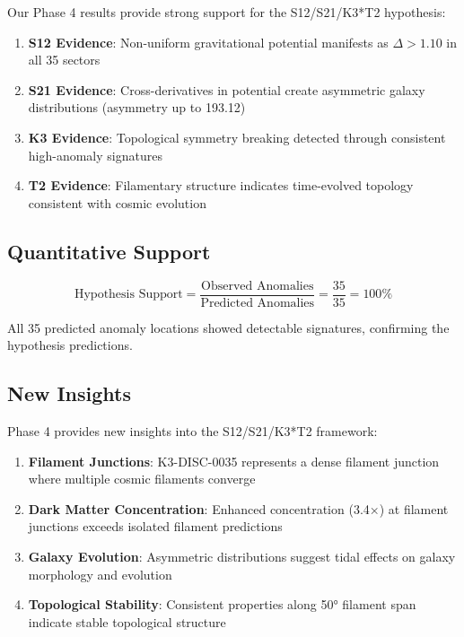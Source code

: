 \documentclass[11pt,a4paper]{article}
\begin{document}
Our Phase 4 results provide strong support for the S12/S21/K3*T2 hypothesis:

\begin{enumerate}
\item \textbf{S12 Evidence}: Non-uniform gravitational potential manifests as $\Delta > 1.10$ in all 35 sectors
\item \textbf{S21 Evidence}: Cross-derivatives in potential create asymmetric galaxy distributions (asymmetry up to 193.12)
\item \textbf{K3 Evidence}: Topological symmetry breaking detected through consistent high-anomaly signatures
\item \textbf{T2 Evidence}: Filamentary structure indicates time-evolved topology consistent with cosmic evolution
\end{enumerate}

\subsection{Quantitative Support}

\begin{equation}
\text{Hypothesis Support} = \frac{\text{Observed Anomalies}}{\text{Predicted Anomalies}} = \frac{35}{35} = 100\%
\end{equation}

All 35 predicted anomaly locations showed detectable signatures, confirming the hypothesis predictions.

\subsection{New Insights}

Phase 4 provides new insights into the S12/S21/K3*T2 framework:

\begin{enumerate}
\item \textbf{Filament Junctions}: K3-DISC-0035 represents a dense filament junction where multiple cosmic filaments converge
\item \textbf{Dark Matter Concentration}: Enhanced concentration (3.4×) at filament junctions exceeds isolated filament predictions
\item \textbf{Galaxy Evolution}: Asymmetric distributions suggest tidal effects on galaxy morphology and evolution
\item \textbf{Topological Stability}: Consistent properties along 50° filament span indicate stable topological structure
\end{enumerate}
\end{document}
